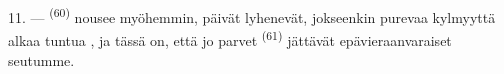 11. ---  \textsuperscript{(60)} nousee myöhemmin, päivät
lyhenevät, jokseenkin purevaa kylmyyttä alkaa tuntua , ja tässä
on, että jo parvet  \textsuperscript{(61)} jättävät
epävieraanvaraiset seutumme.
\VUsaut{6.0mm}
\VUfilet{22mm}
